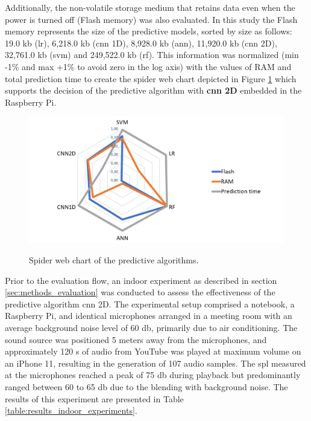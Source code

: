 Additionally, the non-volatile storage medium that retains data even when the power is turned off (Flash memory) was also evaluated. In this study the Flash memory represents the size of the predictive models, sorted by size as follows: 19.0 \gls{k}\gls{b} (\gls{lr}), 6,218.0 \gls{k}\gls{b} (\gls{cnn} 1D), 8,928.0 \gls{k}\gls{b} (\gls{ann}), 11,920.0 \gls{k}\gls{b} (\gls{cnn} 2D), 32,761.0 \gls{k}\gls{b} (\gls{svm}) and 249,522.0 \gls{k}\gls{b} (\gls{rf}). This information was normalized (min -1\% and max +1\% to avoid zero in the log axis) with the values of RAM and total prediction time to create the spider web chart depicted in Figure \ref{fig:Results_spider_chart_us8k_av_cnn2d} which supports the decision of the predictive algorithm with \textbf{\gls{cnn} 2D} embedded in the Raspberry Pi.

\begin{figure}[htbp]
    \raggedright
        \caption{Spider web chart of the predictive algorithms.}
        \includegraphics[width=1\textwidth]{resources/images/060-results/Results_spider_chart_us8k_av_cnn2d.png}
        \label{fig:Results_spider_chart_us8k_av_cnn2d}
\end{figure}

Prior to the evaluation flow, an indoor experiment as described in section \ref{sec:methods_evaluation} was conducted to assess the effectiveness of the predictive algorithm \gls{cnn} 2D. The experimental setup comprised a notebook, a Raspberry Pi, and identical microphones arranged in a meeting room with an average background noise level of 60 \gls{db}, primarily due to air conditioning. The sound source was positioned 5 meters away from the microphones, and approximately 120 \gls{s} of audio from YouTube was played at maximum volume on an iPhone 11, resulting in the generation of 107 audio samples. The \gls{spl} measured at the microphones reached a peak of 75 \gls{db} during playback but predominantly ranged between 60 to 65 \gls{db} due to the blending with background noise. The results of this experiment are presented in Table \ref{table:results_indoor_experiments}.

